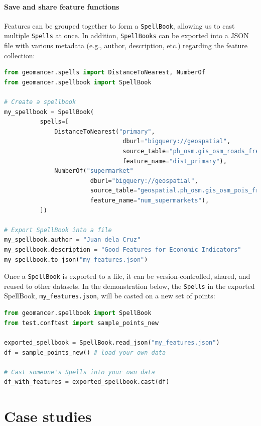 \documentclass{article}
\begin{document}
\paragraph{Save and share feature functions}
Features can be grouped together to form a \texttt{SpellBook}, allowing us to
cast multiple \texttt{Spells} at once. In addition, \texttt{SpellBooks} can be
exported into a JSON file with various metadata (e.g., author, description,
etc.) regarding the feature collection:

\begin{lstlisting}[language=Python]
from geomancer.spells import DistanceToNearest, NumberOf
from geomancer.spellbook import SpellBook

# Create a spellbook
my_spellbook = SpellBook(
          spells=[
              DistanceToNearest("primary",
                                 dburl="bigquery://geospatial",
                                 source_table="ph_osm.gis_osm_roads_free_1",
                                 feature_name="dist_primary"),
              NumberOf("supermarket"
                        dburl="bigquery://geospatial",
                        source_table="geospatial.ph_osm.gis_osm_pois_free_1",
                        feature_name="num_supermarkets"),
          ])

# Export SpellBook into a file
my_spellbook.author = "Juan dela Cruz"
my_spellbook.description = "Good Features for Economic Indicators"
my_spellbook.to_json("my_features.json")
\end{lstlisting}

Once a \texttt{SpellBook} is exported to a file, it can be version-controlled,
shared, and reused to other datasets. In the demonstration below, the
\texttt{Spells} in the exported SpellBook, \texttt{my\_features.json}, will be
casted on a new set of points:

\begin{lstlisting}[language=Python]
from geomancer.spellbook import SpellBook
from test.conftest import sample_points_new

exported_spellbook = SpellBook.read_json("my_features.json")
df = sample_points_new() # load your own data

# Cast someone's Spells into your own data
df_with_features = exported_spellbook.cast(df)
\end{lstlisting}

\section{Case studies}
\end{document}
